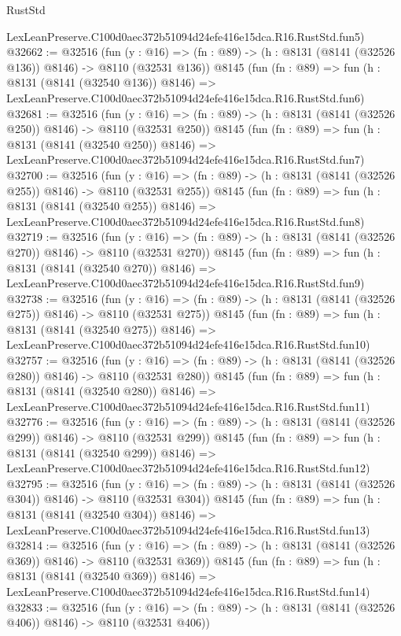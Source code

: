 \begin{lexlean}{RustStd}
\begin{coremodule}
    LexLeanPreserve.C100d0aec372b51094d24efe416e15dca.R16.RustStd.fun5)
@32662 := @32516
    (fun (y : @16) => (fn : @89) -> (h : @8131 (@8141 (@32526 @136)) @8146) -> @8110 (@32531 @136))
    @8145
    (fun (fn : @89) =>
    fun (h : @8131 (@8141 (@32540 @136)) @8146) =>
    LexLeanPreserve.C100d0aec372b51094d24efe416e15dca.R16.RustStd.fun6)
@32681 := @32516
    (fun (y : @16) => (fn : @89) -> (h : @8131 (@8141 (@32526 @250)) @8146) -> @8110 (@32531 @250))
    @8145
    (fun (fn : @89) =>
    fun (h : @8131 (@8141 (@32540 @250)) @8146) =>
    LexLeanPreserve.C100d0aec372b51094d24efe416e15dca.R16.RustStd.fun7)
@32700 := @32516
    (fun (y : @16) => (fn : @89) -> (h : @8131 (@8141 (@32526 @255)) @8146) -> @8110 (@32531 @255))
    @8145
    (fun (fn : @89) =>
    fun (h : @8131 (@8141 (@32540 @255)) @8146) =>
    LexLeanPreserve.C100d0aec372b51094d24efe416e15dca.R16.RustStd.fun8)
@32719 := @32516
    (fun (y : @16) => (fn : @89) -> (h : @8131 (@8141 (@32526 @270)) @8146) -> @8110 (@32531 @270))
    @8145
    (fun (fn : @89) =>
    fun (h : @8131 (@8141 (@32540 @270)) @8146) =>
    LexLeanPreserve.C100d0aec372b51094d24efe416e15dca.R16.RustStd.fun9)
@32738 := @32516
    (fun (y : @16) => (fn : @89) -> (h : @8131 (@8141 (@32526 @275)) @8146) -> @8110 (@32531 @275))
    @8145
    (fun (fn : @89) =>
    fun (h : @8131 (@8141 (@32540 @275)) @8146) =>
    LexLeanPreserve.C100d0aec372b51094d24efe416e15dca.R16.RustStd.fun10)
@32757 := @32516
    (fun (y : @16) => (fn : @89) -> (h : @8131 (@8141 (@32526 @280)) @8146) -> @8110 (@32531 @280))
    @8145
    (fun (fn : @89) =>
    fun (h : @8131 (@8141 (@32540 @280)) @8146) =>
    LexLeanPreserve.C100d0aec372b51094d24efe416e15dca.R16.RustStd.fun11)
@32776 := @32516
    (fun (y : @16) => (fn : @89) -> (h : @8131 (@8141 (@32526 @299)) @8146) -> @8110 (@32531 @299))
    @8145
    (fun (fn : @89) =>
    fun (h : @8131 (@8141 (@32540 @299)) @8146) =>
    LexLeanPreserve.C100d0aec372b51094d24efe416e15dca.R16.RustStd.fun12)
@32795 := @32516
    (fun (y : @16) => (fn : @89) -> (h : @8131 (@8141 (@32526 @304)) @8146) -> @8110 (@32531 @304))
    @8145
    (fun (fn : @89) =>
    fun (h : @8131 (@8141 (@32540 @304)) @8146) =>
    LexLeanPreserve.C100d0aec372b51094d24efe416e15dca.R16.RustStd.fun13)
@32814 := @32516
    (fun (y : @16) => (fn : @89) -> (h : @8131 (@8141 (@32526 @369)) @8146) -> @8110 (@32531 @369))
    @8145
    (fun (fn : @89) =>
    fun (h : @8131 (@8141 (@32540 @369)) @8146) =>
    LexLeanPreserve.C100d0aec372b51094d24efe416e15dca.R16.RustStd.fun14)
@32833 := @32516
    (fun (y : @16) => (fn : @89) -> (h : @8131 (@8141 (@32526 @406)) @8146) -> @8110 (@32531 @406))

\end{coremodule}
\end{lexlean}
